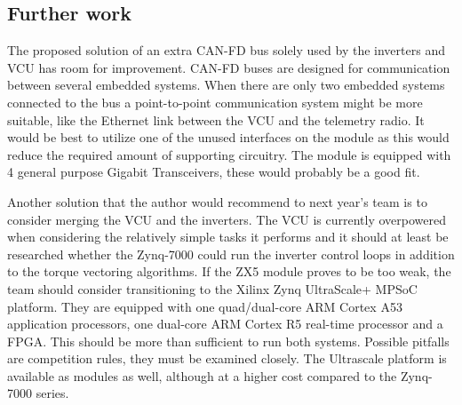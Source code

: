 \subsection{Further work}

The proposed solution of an extra CAN-FD bus solely used by the inverters and VCU has room for improvement. CAN-FD buses are designed for communication between several embedded systems. When there are only two embedded systems connected to the bus a point-to-point communication system might be more suitable, like the Ethernet link between the VCU and the telemetry radio. It would be best to utilize one of the unused interfaces on the module as this would reduce the required amount of supporting circuitry. The module is equipped with 4 general purpose Gigabit Transceivers, these would probably be a good fit.

Another solution that the author would recommend to next year's team is to consider merging the VCU and the inverters. The VCU is currently overpowered when considering the relatively simple tasks it performs and it should at least be researched whether the Zynq-7000 could run the inverter control loops in addition to the torque vectoring algorithms. If the ZX5 module proves to be too weak, the team should consider transitioning to the Xilinx Zynq UltraScale+ MPSoC platform. They are equipped with one quad/dual-core ARM Cortex A53 application processors, one dual-core ARM Cortex R5 real-time processor and a FPGA. This should be more than sufficient to run both systems. Possible pitfalls are competition rules, they must be examined closely. The Ultrascale platform is available as modules as well, although at a higher cost compared to the Zynq-7000 series.


